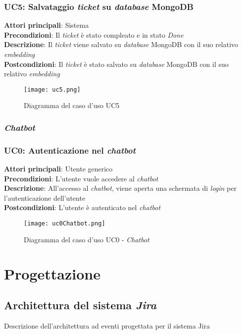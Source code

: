 \subsubsection{UC5: Salvataggio \textit{ticket} su \textit{database} MongoDB}
\textbf{Attori principali}: Sistema \\
\textbf{Precondizioni}: Il \textit{ticket} è stato compleato e in stato \textit{Done} \\
\textbf{Descrizione}: Il \textit{ticket} viene salvato su \textit{database} MongoDB con il suo relativo \textit{embedding} \\
\textbf{Postcondizioni}: Il \textit{ticket} è stato salvato su \textit{database} MongoDB con il suo relativo \textit{embedding} \\
\begin{figure}[H]
    \centering
    \texttt{[image: uc5.png]}
    \caption{Diagramma del caso d'uso UC5}
    \label{fig:UC5}
\end{figure}

\subsubsection{\textit{Chatbot}}
\subsubsection{UC0: Autenticazione nel \textit{chatbot}}


\textbf{Attori principali}: Utente generico \\
\textbf{Precondizioni}: L'utente vuole accedere al \textit{chatbot} \\
\textbf{Descrizione}: All'accesso al \textit{chatbot}, viene aperta una schermata di \textit{login} per l'autenticazione dell'utente \\
\textbf{Postcondizioni}: L'utente è autenticato nel \textit{chatbot} \\


\begin{figure}[H]
    \centering
    \texttt{[image: uc0Chatbot.png]}
    \caption{Diagramma del caso d'uso UC0 - \textit{Chatbot}}
    \label{fig:UC1Chatbot}
\end{figure}
\section{Progettazione}
\subsection{Architettura del sistema \textit{Jira}}
Descrizione dell'architettura ad eventi progettata per il sistema Jira
